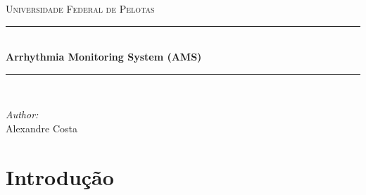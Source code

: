\documentclass[12pt]{article} %
\begin{document}

\begin{titlepage}

\newcommand{\HRule}{\rule{\linewidth}{0.5mm}} %

\center %

\textsc{\LARGE Universidade Federal de Pelotas}\\[1.5cm] %

\HRule \\[0.4cm]
{ \huge \bfseries Arrhythmia Monitoring System (AMS)}\\[0.4cm] %
\HRule \\[1.5cm]

\begin{minipage}{0.4\textwidth}
\begin{flushleft} \large
\emph{Author:}\\
Alexandre Costa %
\end{flushleft}
\end{minipage}

\vfill %

\end{titlepage}


\tableofcontents %

\newpage %


\section{Introdução} %
\end{document}
